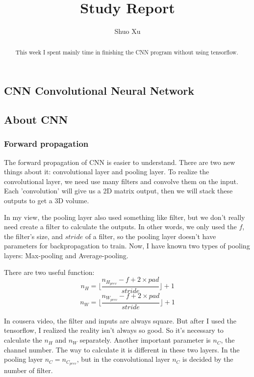 \documentclass[10pt]{article}
\begin{document}
    \title{Study Report}
    \author{Shuo Xu}
    \maketitle
    \begin{abstract}
        This week I spent mainly time in finishing the CNN program without using tensorflow.
    \end{abstract}
    
    \begin{center}
        \section*{CNN Convolutional Neural Network}
    \end{center}
    \subsection*{About CNN}
    \subsubsection*{Forward propagation}
    \begin{flushleft}
        The forward propagation of CNN is easier to understand. There are two new things about it: convolutional layer and pooling layer. To realize the convolutional layer, we need use many filters and convolve them on the input. Each 'convolution' will give us a 2D matrix output, then we will stack these outputs to get a 3D volume.  \vspace{2ex}

        In my view, the pooling layer also used something like filter, but we don't really need create a filter to calculate the outputs. In other words, we only used the $f$, the filter's size, and $stride$ of a filter, so the pooling layer doesn't have parameters for backpropagation to train. Now, I have known two types of pooling layers: Max-pooling and Average-pooling.\vspace{2ex}

        There are two useful function:$$ n_H = \lfloor \frac{n_{H_{prev}} - f + 2 \times pad}{stride} \rfloor +1 $$
        $$ n_W = \lfloor \frac{n_{W_{prev}} - f + 2 \times pad}{stride} \rfloor +1 $$\vspace{2ex}

        In cousera video, the filter and inputs are always square. But after I used the tensorflow, I realized the reality isn't always so good. So it's necessary to calculate the $n_H$ and $n_W$ separately. Another important parameter is $n_C$, the channel number. The way to calculate it is different in these two layers. In the pooling layer $n_C = n_{C_{prev}}$, but in the convolutional layer $n_C$ is decided by the number of filter.
    \end{flushleft}
\end{document}
